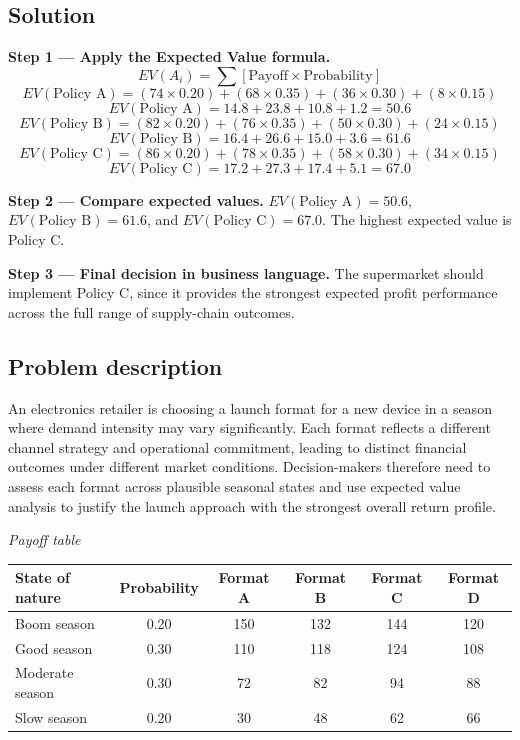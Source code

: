 \begin{ExamProblems}
		\subsection*{Solution}
		\textbf{Step 1 --- Apply the Expected Value formula.}
		\[
		EV(A_i)=\sum [\text{Payoff}\times\text{Probability}]
		\]
		\[
		EV(\text{Policy A})=(74\times0.20)+(68\times0.35)+(36\times0.30)+(8\times0.15)
		\]
		\[
		EV(\text{Policy A})=14.8+23.8+10.8+1.2=50.6
		\]
		\[
		EV(\text{Policy B})=(82\times0.20)+(76\times0.35)+(50\times0.30)+(24\times0.15)
		\]
		\[
		EV(\text{Policy B})=16.4+26.6+15.0+3.6=61.6
		\]
		\[
		EV(\text{Policy C})=(86\times0.20)+(78\times0.35)+(58\times0.30)+(34\times0.15)
		\]
		\[
		EV(\text{Policy C})=17.2+27.3+17.4+5.1=67.0
		\]
		
		\textbf{Step 2 --- Compare expected values.}
		$EV(\text{Policy A})=50.6$, $EV(\text{Policy B})=61.6$, and $EV(\text{Policy C})=67.0$.
		The highest expected value is Policy C.
		
		\textbf{Step 3 --- Final decision in business language.}
		The supermarket should implement Policy C, since it provides the strongest expected profit performance across the full range of supply-chain outcomes.
		
		\item
		\subsection*{Problem description}
		An electronics retailer is choosing a launch format for a new device in a season where demand intensity may vary significantly. Each format reflects a different channel strategy and operational commitment, leading to distinct financial outcomes under different market conditions. Decision-makers therefore need to assess each format across plausible seasonal states and use expected value analysis to justify the launch approach with the strongest overall return profile.

		\begin{center}
			\textit{Payoff table} \par
			\begin{tabular}{l c c c c c}
				\toprule
				State of nature & Probability & Format A & Format B & Format C & Format D \\
				\midrule
				Boom season & 0.20 & 150 & 132 & 144 & 120 \\
				Good season & 0.30 & 110 & 118 & 124 & 108 \\
				Moderate season & 0.30 & 72 & 82 & 94 & 88 \\
				Slow season & 0.20 & 30 & 48 & 62 & 66 \\
				\bottomrule
			\end{tabular}
		\end{center}


\end{ExamProblems}
